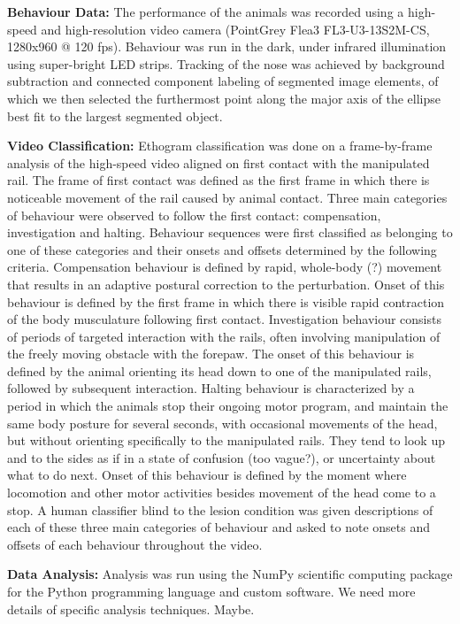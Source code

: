 \textbf{Behaviour Data:} The performance of the animals was recorded using a high-speed and high-resolution video camera (PointGrey Flea3 FL3-U3-13S2M-CS, 1280x960 @ 120 fps). Behaviour was run in the dark, under infrared illumination using super-bright LED strips. Tracking of the nose was achieved by background subtraction and connected component labeling of segmented image elements, of which we then selected the furthermost point along the major axis of the ellipse best fit to the largest segmented object.

\textbf{Video Classification:} Ethogram classification was done on a frame-by-frame analysis of the high-speed video aligned on first contact with the manipulated rail. The frame of first contact was defined as the first frame in which there is noticeable movement of the rail caused by animal contact. Three main categories of behaviour were observed to follow the first contact: compensation, investigation and halting. Behaviour sequences were first classified as belonging to one of these categories and their onsets and offsets determined by the following criteria. Compensation behaviour is defined by rapid, whole-body (?) movement that results in an adaptive postural correction to the perturbation. Onset of this behaviour is defined by the first frame in which there is visible rapid contraction of the body musculature following first contact. Investigation behaviour consists of periods of targeted interaction with the rails, often involving manipulation of the freely moving obstacle with the forepaw. The onset of this behaviour is defined by the animal orienting its head down to one of the manipulated rails, followed by subsequent interaction. Halting behaviour is characterized by a period in which the animals stop their ongoing motor program, and maintain the same body posture for several seconds, with occasional movements of the head, but without orienting specifically to the manipulated rails. They tend to look up and to the sides as if in a state of confusion (too vague?), or uncertainty about what to do next. Onset of this behaviour is defined by the moment where locomotion and other motor activities besides movement of the head come to a stop. A human classifier blind to the lesion condition was given descriptions of each of these three main categories of behaviour and asked to note onsets and offsets of each behaviour throughout the video.

\textbf{Data Analysis:} Analysis was run using the NumPy scientific computing package for the Python programming language and custom software. We need more details of specific analysis techniques. Maybe.
